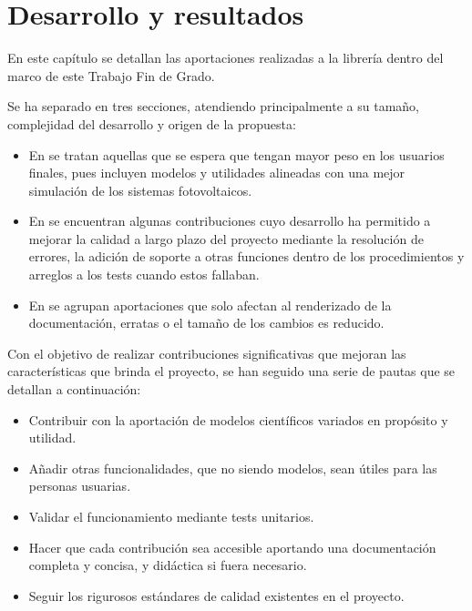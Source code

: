 \chapter{Desarrollo y resultados} \label{chp:desarrollo}

En este capítulo se detallan las aportaciones realizadas a la librería \pvlibpy{} dentro del marco de este Trabajo Fin de Grado.

Se ha separado en tres secciones, atendiendo principalmente a su tamaño, complejidad del desarrollo y origen de la propuesta:

\begin{itemize}
    \item En  se tratan aquellas que se espera que tengan mayor peso en los usuarios finales, pues incluyen modelos y utilidades alineadas con una mejor simulación de los sistemas fotovoltaicos.
    \item En  se encuentran algunas contribuciones cuyo desarrollo ha permitido a mejorar la calidad a largo plazo del proyecto mediante la resolución de errores, la adición de soporte a otras funciones dentro de los procedimientos y arreglos a los tests cuando estos fallaban.
    \item En  se agrupan aportaciones que solo afectan al renderizado de la documentación, erratas o el tamaño de los cambios es reducido.
\end{itemize}

Con el objetivo de realizar contribuciones significativas que mejoran las características que brinda el proyecto, se han seguido una serie de pautas que se detallan a continuación:

\begin{itemize}
    \item Contribuir con la aportación de modelos científicos variados en propósito y utilidad.

    \item Añadir otras funcionalidades, que no siendo modelos, sean útiles para las personas usuarias.

    \item Validar el funcionamiento mediante tests unitarios.

    \item Hacer que cada contribución sea accesible aportando una \gls{documentación} completa y concisa, y didáctica si fuera necesario.

    \item Seguir los rigurosos estándares de calidad existentes en el proyecto.
\end{itemize}

